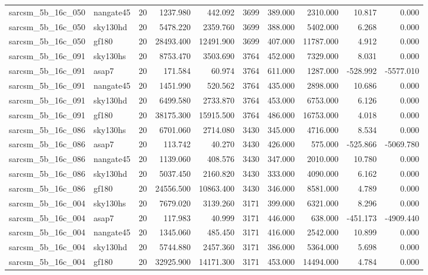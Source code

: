 \begin{tabular}{llrrrrrrrr}
sarcsm\_5b\_16c\_050 & nangate45 & 20 & 1237.980 & 442.092 & 3699 & 389.000 & 2310.000 & 10.817 & 0.000 \\
sarcsm\_5b\_16c\_050 & sky130hd & 20 & 5478.220 & 2359.760 & 3699 & 388.000 & 5402.000 & 6.268 & 0.000 \\
sarcsm\_5b\_16c\_050 & gf180 & 20 & 28493.400 & 12491.900 & 3699 & 407.000 & 11787.000 & 4.912 & 0.000 \\
sarcsm\_5b\_16c\_091 & sky130hs & 20 & 8753.470 & 3503.690 & 3764 & 452.000 & 7329.000 & 8.031 & 0.000 \\
sarcsm\_5b\_16c\_091 & asap7 & 20 & 171.584 & 60.974 & 3764 & 611.000 & 1287.000 & -528.992 & -5577.010 \\
sarcsm\_5b\_16c\_091 & nangate45 & 20 & 1451.990 & 520.562 & 3764 & 435.000 & 2898.000 & 10.686 & 0.000 \\
sarcsm\_5b\_16c\_091 & sky130hd & 20 & 6499.580 & 2733.870 & 3764 & 453.000 & 6753.000 & 6.126 & 0.000 \\
sarcsm\_5b\_16c\_091 & gf180 & 20 & 38175.300 & 15915.500 & 3764 & 486.000 & 16753.000 & 4.018 & 0.000 \\
sarcsm\_5b\_16c\_086 & sky130hs & 20 & 6701.060 & 2714.080 & 3430 & 345.000 & 4716.000 & 8.534 & 0.000 \\
sarcsm\_5b\_16c\_086 & asap7 & 20 & 113.742 & 40.270 & 3430 & 426.000 & 575.000 & -525.866 & -5069.780 \\
sarcsm\_5b\_16c\_086 & nangate45 & 20 & 1139.060 & 408.576 & 3430 & 347.000 & 2010.000 & 10.780 & 0.000 \\
sarcsm\_5b\_16c\_086 & sky130hd & 20 & 5037.450 & 2160.820 & 3430 & 333.000 & 4090.000 & 6.162 & 0.000 \\
sarcsm\_5b\_16c\_086 & gf180 & 20 & 24556.500 & 10863.400 & 3430 & 346.000 & 8581.000 & 4.789 & 0.000 \\
sarcsm\_5b\_16c\_004 & sky130hs & 20 & 7679.020 & 3139.260 & 3171 & 399.000 & 6321.000 & 8.296 & 0.000 \\
sarcsm\_5b\_16c\_004 & asap7 & 20 & 117.983 & 40.999 & 3171 & 446.000 & 638.000 & -451.173 & -4909.440 \\
sarcsm\_5b\_16c\_004 & nangate45 & 20 & 1345.060 & 485.450 & 3171 & 416.000 & 2542.000 & 10.899 & 0.000 \\
sarcsm\_5b\_16c\_004 & sky130hd & 20 & 5744.880 & 2457.360 & 3171 & 386.000 & 5364.000 & 5.698 & 0.000 \\
sarcsm\_5b\_16c\_004 & gf180 & 20 & 32925.900 & 14171.300 & 3171 & 453.000 & 14494.000 & 4.784 & 0.000 \\

\end{tabular}
